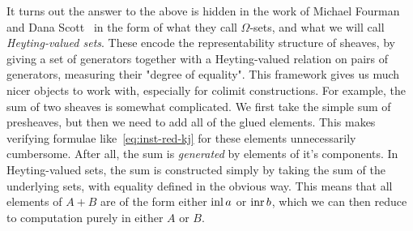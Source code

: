 It turns out the answer to the above is hidden in the work of Michael Fourman and Dana Scott~\cite{FS79} in the form of what they call \(Ω\)-sets, and what we will call \emph{Heyting-valued sets}. These encode the representability structure of sheaves, by giving a set of generators together with a Heyting-valued relation on pairs of generators, measuring their "degree of equality".
This framework gives us much nicer objects to work with, especially for colimit constructions. For example, the sum of two sheaves is somewhat complicated. We first take the simple sum of presheaves, but then we need to add all of the glued elements. This makes verifying formulae like~\ref{eq:inst-red-kj} for these elements unnecessarily cumbersome.
After all, the sum is \emph{generated} by elements of it's components. In Heyting-valued sets, the sum is constructed simply by taking the sum of the underlying sets, with equality defined in the obvious way. This means that all elements of \(A + B\) are of the form either \(\operatorname{inl} a\) or \(\operatorname{inr} b\), which we can then reduce to computation purely in either \(A\) or \(B\).


